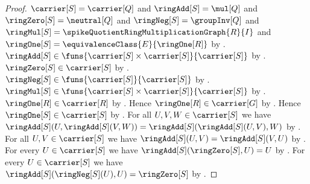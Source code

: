 \begin{proof}
    $\carrier[S]=\carrier[Q]$ and $\ringAdd[S]=\mul[Q]$ and
        $\ringZero[S]=\neutral[Q]$ and
        $\ringNeg[S]=\groupInv[Q]$ and
        $\ringMul[S]=\spikeQuotientRingMultiplicationGraph{R}{I}$ and
        $\ringOne[S]=\equivalenceClass{E}{\ringOne[R]}$ by
        .
    $\ringAdd[S]\in
        \funs{\carrier[S]\times\carrier[S]}{\carrier[S]}$ by
        .
    $\ringZero[S]\in\carrier[S]$ by .
    $\ringNeg[S]\in\funs{\carrier[S]}{\carrier[S]}$ by
        .
    $\ringMul[S]\in
        \funs{\carrier[S]\times\carrier[S]}{\carrier[S]}$ by
        .
    $\ringOne[R]\in\carrier[R]$ by .
    Hence $\ringOne[R]\in\carrier[G]$ by
        .
    Hence $\ringOne[S]\in\carrier[S]$ by
        .
    For all $U,V,W\in\carrier[S]$ we have
        $\ringAdd[S](U,\ringAdd[S](V,W))
            =\ringAdd[S](\ringAdd[S](U,V),W)$ by
        .
    For all $U,V\in\carrier[S]$ we have
        $\ringAdd[S](U,V)=\ringAdd[S](V,U)$ by \auto.
    For every $U\in\carrier[S]$ we have
        $\ringAdd[S](\ringZero[S],U)=U$ by
        .
    For every $U\in\carrier[S]$ we have
        $\ringAdd[S](\ringNeg[S](U),U)=\ringZero[S]$ by
        .


\end{proof}
